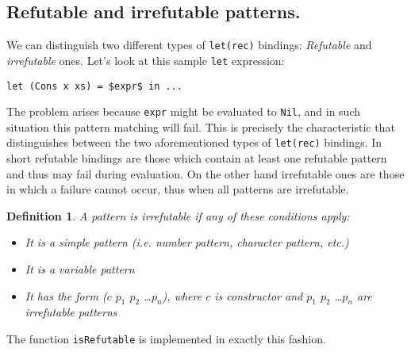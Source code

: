 \documentclass[a4paper]{report}
\newtheorem{definition}{Definition}[chapter]
\begin{document}
\subsection{Refutable and irrefutable patterns.}
\label{sec:irrefutable_patterns}
We can distinguish two different types of \texttt{let(rec)} bindings:
\textit{Refutable} and \textit{irrefutable} ones. Let's look at this sample
\texttt{let} expression:
\begin{lstlisting}[mathescape=true,label=lst:conformality_check,caption={Pattern matching \texttt{let} binding.}]
let (Cons x xs) = $expr$ in ...
\end{lstlisting}
The problem arises because \texttt{expr} might be evaluated to \texttt{Nil},
and in such situation this pattern matching will fail. This is precisely the
characteristic that distinguishes between the two aforementioned types of
\texttt{let(rec)} bindings. In short refutable bindings are those which contain
at least one refutable pattern and thus may fail during evaluation. On the
other hand irrefutable ones are those in which a failure cannot occur, thus
when all patterns are irrefutable.

\begin{definition}
  \label{def:irrefutable_pattern}
  A pattern is irrefutable if any of these conditions apply:
  \begin{itemize}
    \item It is a simple pattern (i.e. number pattern, character pattern, etc.)
    \item It is a variable pattern
    \item It has the form ($c$ $p_{1}$ $p_{2}$ \ldots $p_{n}$), where $c$ is
      constructor and $p_{1}$ $p_{2}$ \ldots $p_{n}$ are irrefutable patterns
  \end{itemize}
\end{definition}
The function \texttt{isRefutable} is implemented in exactly this fashion.
\end{document}
